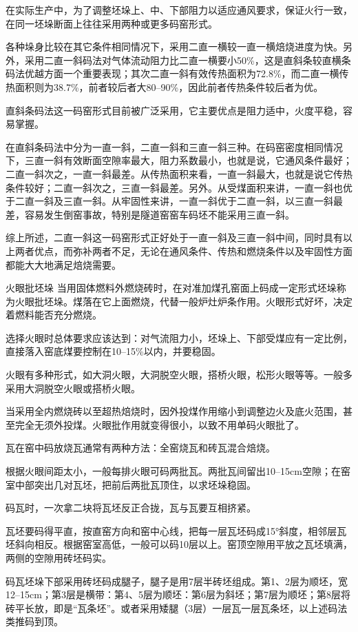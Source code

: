 \documentclass{ctexbook}
\begin{document}
在实际生产中，为了调整坯垛上、中、下部阻力以适应通风要求，保证火行一致，在同一坯垛断面上往往采用两种或更多码窑形式。

各种垛身比较在其它条件相同情况下，采用二直一横较一直一横焙烧进度为快。另外，采用二直一斜码法对气体流动阻力比二直一横要小50\%，这是直斜条较直横条码法优越方面一个重要表现；其次二直一斜有效传热面积为72.8\%，而二直一横传热面积则为38.7\%，前者较后者大80--90\%，因此前者传热条件较后者为优。

直斜条码法这一码窑形式目前被广泛采用，它主要优点是阻力适中，火度平稳，容易掌握。

在直斜条码法中分为一直一斜，二直一斜和三直一斜三种。在码窑密度相同情况下，三直一斜有效断面空隙率最大，阻力系数最小，也就是说，它通风条件最好；二直一斜次之，一直一斜最差。从传热面积来看，一直一斜最大，也就是说它传热条件较好；二直一斜次之，三直一斜最差。另外。从受煤面积来讲，一直一斜也优于二直一斜及三直一斜。从牢固性来讲，一直一斜优于二直一斜，以三直一斜最差，容易发生倒窑事故，特别是隧道窑窑车码坯不能采用三直一斜。

综上所述，二直一斜这一码窑形式正好处于一直一斜及三直一斜中间，同时具有以上两者优点，而弥补两者不足，无论在通风条件、传热和燃烧条件以及牢固性方面都能大大地满足焙烧需要。

火眼批坯垛 当用固体燃料外燃烧砖时，在对准加煤孔窑面上码成一定形式坯垛称为火眼批坯垛。煤落在它上面燃烧，代替一般炉灶炉条作用。火眼形式好坏，决定着燃料能否充分燃烧。

选择火眼时总体要求应该达到：对气流阻力小，坯垛上、下部受煤应有一定比例，直接落入窑底煤要控制在10--15\%以内，并要稳固。

火眼有多种形式，如大洞火眼，大洞脱空火眼，搭桥火眼，松形火眼等等。一般多采用大洞脱空火眼或搭桥火眼。

当采用全内燃烧砖以至超热焙烧时，因外投煤作用缩小到调整边火及底火范围，甚至完全无须外投煤。火眼批作用就变得很小，以致不用单码火眼批了。

瓦在窑中码放烧瓦通常有两种方法：全窑烧瓦和砖瓦混合焙烧。

根据火眼间距太小，一般每排火眼可码两批瓦。两批瓦间留出10--15cm空隙；在窑室中部突出几对瓦坯，把前后两批瓦顶住，以求坯垛稳固。

码瓦时，一次拿二块将瓦坯反正合拢，瓦与瓦要互相挤紧。

瓦坯要码得平直，按直窑方向和窑中心线，把每一层瓦坯码成15°斜度，相邻层瓦坯斜向相反。根据窑室高低，一般可以码10层以上。窑顶空隙用平放之瓦坯填满，两侧的空隙用砖坯码实。

码瓦坯垛下部采用砖坯码成腿子，腿子是用7层半砖坯组成。第1、2层为顺坯，宽12--15cm；第3层是横带：第4、5层为顺坯：第6层为斜坯；第7层为顺坯；第8层将砖平长放，即是“瓦条坯”。或者采用矮腿（3层）一层瓦一层瓦条坯，以上述码法类推码到顶。
\end{document}
